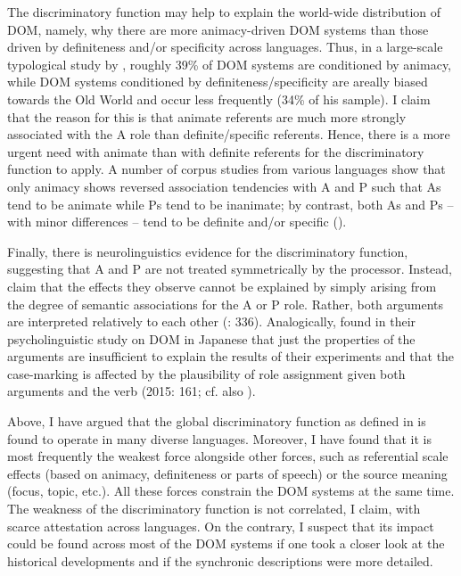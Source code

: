 \documentclass[output=paper]{langsci/langscibook}
\begin{document}
The discriminatory function may help to explain the world-wide distribution of DOM, namely, why there are more animacy-driven DOM systems than those driven by definiteness and/or specificity across languages. Thus, in a large-scale typological study by \citet[295]{Sinnemäki2014}, roughly 39\% of DOM systems are conditioned by animacy, while DOM systems conditioned by definiteness/specificity are areally biased towards the Old World and occur less frequently (34\% of his sample). I claim that the reason for this is that animate referents are much more strongly associated with the A role than definite/specific referents. Hence, there is a more urgent need with animate than with definite referents for the discriminatory function to apply. A number of corpus studies from various languages show that only animacy shows reversed association tendencies with A and P such that As tend to be animate while Ps tend to be inanimate; by contrast, both As and Ps – with minor differences – tend to be definite and/or specific (\citealt{Dahl2000,Hofling2003,Everett2009,FauconnierVerstraete2014}). 

Finally, there is neurolinguistics evidence for the discriminatory function, suggesting that A and P are not treated symmetrically by the processor. Instead, \citet{Bornkessel-SchlesewskySchlesewsky2015} claim that the effects they observe cannot be explained by simply arising from the degree of semantic associations for the A or P role. Rather, both arguments are interpreted relatively to each other (\citealt{Bornkessel-SchlesewskySchlesewsky2015}: 336). Analogically, \citet{KurumadaJaeger2015} found in their psycholinguistic study on DOM in Japanese that just the properties of the arguments are insufficient to explain the results of their experiments and that the case-marking is affected by the plausibility of role assignment given both arguments and the verb (2015: 161; cf. also \citealt{AhnCho2007,FedzechkinaEtAl2012}).

Above, I have argued that the global discriminatory function as defined in  is found to operate in many diverse languages. Moreover, I have found that it is most frequently the weakest force alongside other forces, such as referential scale effects (based on animacy, definiteness or parts of speech) or the source meaning (focus, topic, etc.). All these forces constrain the DOM systems at the same time. The weakness of the discriminatory function is not correlated, I claim, with scarce attestation across languages. On the contrary, I suspect that its impact could be found across most of the DOM systems if one took a closer look at the historical developments and if the synchronic descriptions were more detailed. 
\end{document}
